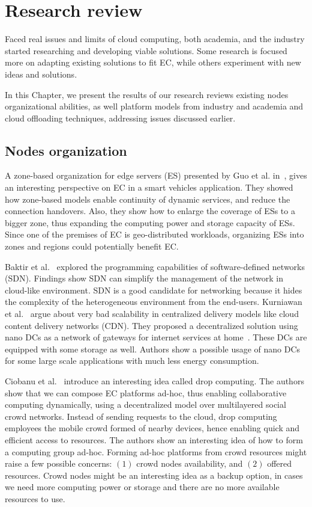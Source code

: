 \chapter{Research review}\label{chapter:Review}
%
Faced real issues and limits of cloud computing, both academia, and the industry started researching and developing viable solutions. Some research is focused more on adapting existing solutions to fit EC, while others experiment with new ideas and solutions. 

In this Chapter, we present the results of our research reviews existing nodes organizational abilities, as well platform models from industry and academia and cloud offloading techniques, addressing issues discussed earlier.
%
%
\section{Nodes organization}\label{sec:nodes_organization}
A zone-based organization for edge servers (ES) presented by Guo et al. in~\cite{GuoRG20}, gives an interesting perspective on EC in a smart vehicles application. They showed how zone-based models enable continuity of dynamic services, and reduce the connection handovers. Also, they show how to enlarge the coverage of ESs to a bigger zone, thus expanding the computing power and storage capacity of ESs. Since one of the premises of EC is geo-distributed workloads, organizing ESs into zones and regions could potentially benefit EC. 

Baktir et al.~\cite{BaktirOE17} explored the programming capabilities of software-defined networks (SDN). Findings show SDN can simplify the management of the network in cloud-like environment. SDN is a good candidate for networking because it hides the complexity of the heterogeneous environment from the end-users.
Kurniawan et al.~\cite{inbookKurniawan} argue about very bad scalability in centralized delivery models like cloud content delivery networks (CDN). They proposed a decentralized solution using nano DCs as a network of gateways for internet services at home~\cite{inbookKurniawan}. These DCs are equipped with some storage as well. Authors show a possible usage of nano DCs for some large scale applications with much less energy consumption. 

Ciobanu et al.~\cite{CiobanuNPDMM19} introduce an interesting idea called drop computing. The authors show that we can compose EC platforms ad-hoc, thus enabling collaborative computing dynamically, using a decentralized model over multilayered social crowd networks. Instead of sending requests to the cloud, drop computing employees the mobile crowd formed of nearby devices, hence enabling quick and efficient access to resources. The authors show an interesting idea of how to form a computing group ad-hoc. Forming ad-hoc platforms from crowd resources might raise a few possible concerns: $(1)$ crowd nodes availability, and $(2)$ offered resources. Crowd nodes might be an interesting idea as a backup option, in cases we need more computing power or storage and there are no more available resources to use.

